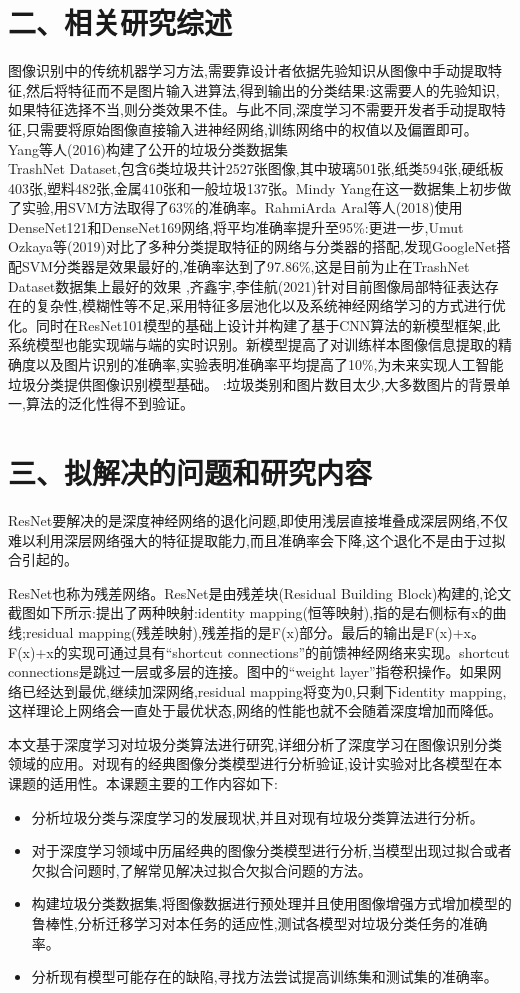 \documentclass[12pt, a4paper, oneside]{ctexart}
\begin{document}
\section*{二、相关研究综述}
图像识别中的传统机器学习方法,需要靠设计者依据先验知识从图像中手动提取特征,然后将特征而不是图片输入进算法,得到输出的分类结果:这需要人的先验知识,如果特征选择不当,则分类效果不佳。与此不同,深度学习不需要开发者手动提取特征,只需要将原始图像直接输入进神经网络,训练网络中的权值以及偏置即可。
 Yang等人(2016)构建了公开的垃圾分类数据集\\TrashNet Dataset,包含6类垃圾共计2527张图像,其中玻璃501张,纸类594张,硬纸板403张,塑料482张,金属410张和一般垃圾137张。Mindy Yang在这一数据集上初步做了实验,用SVM方法取得了63\%的准确率。RahmiArda Aral等人(2018)使用DenseNet121和DenseNet169网络,将平均准确率提升至95\%:更进一步,Umut Ozkaya等(2019)对比了多种分类提取特征的网络与分类器的搭配,发现GoogleNet搭配SVM分类器是效果最好的,准确率达到了97.86\%,这是目前为止在TrashNet Dataset数据集上最好的效果
,齐鑫宇,李佳航(2021)针对目前图像局部特征表达存在的复杂性,模糊性等不足,采用特征多层池化以及系统神经网络学习的方式进行优化。同时在ResNet101模型的基础上设计并构建了基于CNN算法的新模型框架,此系统模型也能实现端与端的实时识别。新模型提高了对训练样本图像信息提取的精确度以及图片识别的准确率,实验表明准确率平均提高了10\%,为未来实现人工智能垃圾分类提供图像识别模型基础。
:垃圾类别和图片数目太少,大多数图片的背景单一,算法的泛化性得不到验证。
\newpage
\section*{三、拟解决的问题和研究内容}
ResNet要解决的是深度神经网络的退化问题,即使用浅层直接堆叠成深层网络,不仅难以利用深层网络强大的特征提取能力,而且准确率会下降,这个退化不是由于过拟合引起的。
\par ResNet也称为残差网络。ResNet是由残差块(Residual Building Block)构建的,论文截图如下所示:提出了两种映射:identity mapping(恒等映射),指的是右侧标有x的曲线;residual mapping(残差映射),残差指的是F(x)部分。最后的输出是F(x)+x。F(x)+x的实现可通过具有``shortcut connections”的前馈神经网络来实现。shortcut connections是跳过一层或多层的连接。图中的``weight layer”指卷积操作。如果网络已经达到最优,继续加深网络,residual mapping将变为0,只剩下identity mapping,这样理论上网络会一直处于最优状态,网络的性能也就不会随着深度增加而降低。
\par 本文基于深度学习对垃圾分类算法进行研究,详细分析了深度学习在图像识别分类领域的应用。对现有的经典图像分类模型进行分析验证,设计实验对比各模型在本课题的适用性。本课题主要的工作内容如下:
\begin{itemize}
    \item 分析垃圾分类与深度学习的发展现状,并且对现有垃圾分类算法进行分析。
    \item 对于深度学习领域中历届经典的图像分类模型进行分析,当模型出现过拟合或者欠拟合问题时,了解常见解决过拟合欠拟合问题的方法。
    \item 构建垃圾分类数据集,将图像数据进行预处理并且使用图像增强方式增加模型的鲁棒性,分析迁移学习对本任务的适应性,测试各模型对垃圾分类任务的准确率。
    \item 分析现有模型可能存在的缺陷,寻找方法尝试提高训练集和测试集的准确率。
\end{itemize}
\newpage
\end{document}
